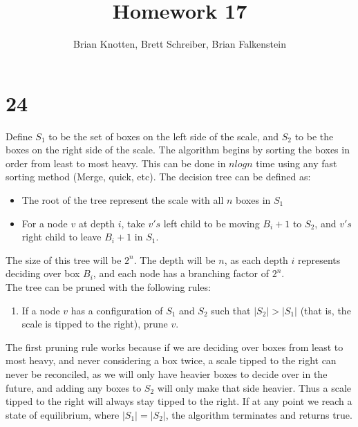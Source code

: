 \documentclass[letterpaper,notitlepage,twoside]{article}
\begin{document}
\title{Homework 17}
\author{Brian Knotten, Brett Schreiber, Brian Falkenstein}
\maketitle

\section*{24}
Define $S_1$ to be the set of boxes on the left side of the scale, and $S_2$ to be the boxes on the right side of the scale. The algorithm begins by sorting the boxes in order from least to most heavy. This can be done in $nlogn$ time using any fast sorting method (Merge, quick, etc). 
The decision tree can be defined as:
\begin{itemize}
\item The root of the tree represent the scale with all $n$ boxes in $S_1$
\item For a node $v$ at depth $i$, take $v's$ left child to be moving $B_i+1$ to $S_2$, and $v's$ right child to leave $B_i+1$ in $S_1$. 
\end{itemize}
The size of this tree will be $2^n$. The depth will be $n$, as each depth $i$ represents deciding over box $B_i$, and each node has a branching factor of $2^n$. \\
The tree can be pruned with the following rules:
\begin{enumerate}
\item If a node $v$ has a configuration of $S_1$ and $S_2$ such that $|S_2|>|S_1|$ (that is, the scale is tipped to the right), prune $v$. 
\end{enumerate}
The first pruning rule works because if we are deciding over boxes from least to most heavy, and never considering a box twice, a scale tipped to the right can never be reconciled, as we will only have heavier boxes to decide over in the future, and adding any boxes to $S_2$ will only make that side heavier. Thus a scale tipped to the right will always stay tipped to the right. If at any point we reach a state of equilibrium, where $|S_1| = |S_2|$, the algorithm terminates and returns true. 
\end{document}
